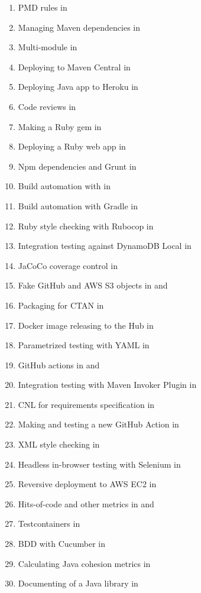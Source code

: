 \documentclass[nobrand,anonymous,nodate,nosecurity]{huawei}
\begin{document}
{\begin{enumerate}
	\item PMD rules in 
	\item Managing Maven dependencies in 
	\item Multi-module  in 
	\item Deploying to Maven Central in 
	\item Deploying Java app to Heroku in 
	\item Code reviews in 
	\item Making a Ruby gem in 
	\item Deploying a Ruby web app in 
	\item Npm dependencies and Grunt in 
	\item Build automation with  in 
	\item Build automation with Gradle in 
	\item Ruby style checking with Rubocop in 
	\item Integration testing against DynamoDB Local in 
	\item JaCoCo coverage control in 
	\item Fake GitHub and AWS S3 objects in  and 
	\item Packaging for CTAN in 
  \item Docker image releasing to the Hub in 
  \item Parametrized testing with YAML in 
  \item GitHub actions in  and 
  \item Integration testing with Maven Invoker Plugin in 
  \item CNL for requirements specification in 
  \item Making and testing a new GitHub Action in 
  \item XML style checking in 
  \item Headless in-browser testing with Selenium in 
  \item Reversive deployment to AWS EC2 in 
  \item Hits-of-code and other metrics in  and 
  \item Testcontainers in 
  \item BDD with Cucumber in 
  \item Calculating Java cohesion metrics in 
  \item Documenting  of a Java library in 
\end{enumerate}

}
\end{document}
